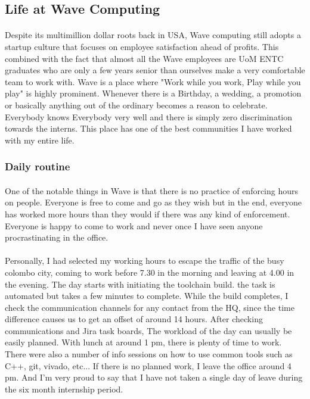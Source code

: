 
\newpage
\subsection{Life at Wave Computing}

\paragraph{}
Despite its multimillion dollar roots back in USA, Wave computing still adopts a startup culture that focuses on employee satisfaction ahead of profits. This combined with the fact that almost all the Wave employees are UoM ENTC graduates who are only a few years senior than ourselves make a very comfortable team to work with. Wave is a place where "Work while you work, Play while you play" is highly prominent. Whenever there is a Birthday, a wedding, a promotion or basically anything out of the ordinary becomes a reason to celebrate. Everybody knows Everybody very well and there is simply zero discrimination towards the interns. This place has one of the best communities I have worked with my entire life.

\subsubsection{Daily routine}
\paragraph{}
One of the notable things in Wave is that there is no practice of enforcing hours on people. Everyone is free to come and go as they wish but in the end, everyone has worked more hours than they would if there was any kind of enforcement. Everyone is happy to come to work and never once I have seen anyone procrastinating in the office. 

\paragraph{}
Personally, I had selected my working hours to escape the traffic of the busy colombo city, coming to work before 7.30 in the morning and leaving at 4.00 in the evening. The day starts with initiating the toolchain build. the task is automated but takes a few minutes to complete. While the build completes, I check the communication channels for any contact from the HQ, since the time difference causes us to get an offset of around 14 hours. After checking communications and Jira task boards, The workload of the day can usually be easily planned. With lunch at around 1 pm, there is plenty of time to work. There were also a number of info sessions on how to use common tools such as C++, git, vivado, etc... If there is no planned work, I leave the office around 4 pm. And I'm very proud to say that I have not taken a single day of leave during the six month internship period.

